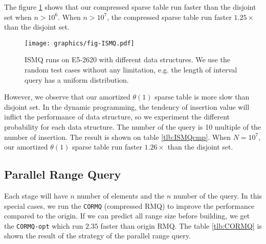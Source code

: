 The figure \ref{fig:fig-ISMQcmp} shows that our compressed sparse
table run faster than the disjoint set when $n > 10^6$.  When $n >
10^7$, the compressed sparse table run faster $1.25 \times$ than the
disjoint set.  



\begin{figure}[!thb]
  \centering
  \texttt{[image: graphics/fig-ISMQ.pdf]}
  \caption{ISMQ runs on E5-2620 with different data structures. We use the random test cases without any limitation, e.g. the length of interval query has a uniform distribution.}
  \label{fig:fig-ISMQcmp}
\end{figure}

However, we observe that our amortized $\theta(1)$ sparse table is
more slow than disjoint set.  In the dynamic programming, the tendency
of insertion value will inflict the performance of data structure, so
we experiment the different probability for each data structure.  The
number of the query is 10 multiple of the number of insertion.  The
result is shown on table \ref{tlb:ISMQcmp}.  When $N=10^7$, our
amortized $\theta(1)$ sparse table run faster $1.26 \times$ than the
disjoint set.

\iffalse
當運行 $n > 10^6$ 時，我們提出的壓縮稀疏表的效能已經勝過并查集的版本，
其運行結果如圖表 ~\ref{fig:fig-ISMQcmp}。在 $n = 10^7$ 時，加速 $1.25 \times$。
然而，我們提供的 amortized $\theta(1)$ 的稀疏表慢於并查集，
我們做了深入的機率探討 (參照表 ~\ref{tlb:ISMQcmp})，由於大部分的操作都被區塊後綴和前綴解決，
沒有實際運用到內部詢問，約束區間詢問的大小為 $L$，在 $N = 10^7$ 時，最多能加速 $1.26 \times$，
其中插入和詢問比例為 1:10，當詢問比重更大時，將有更明顯的加速。
\fi



\subsection{Parallel Range Query}

Each stage will have $n$ number of elements and the $n$ number of the
query.  In this special cases, we run the \texttt{CORMQ} (compressed
RMQ) to improve the performance compared to the origin.  If we can
predict all range size before building, we get the \texttt{CORMQ-opt}
which run $2.35$ faster than origin RMQ.  The table \ref{tlb:CORMQ} is
shown the result of the strategy of the parallel range query.

\iffalse
每一次有 $n$ 個元素和 $n$ 組詢問，針對這種特殊性質的問題，
我們運行樸素的 \texttt{CORMQ} (cache-oblivious RMQ) 得到效能改善，
搭配可預測的分析降低運算量 (參照 \texttt{CORMQ-opt})，得到更好的改善。
在 \texttt{CORMQ-opt} 策略中，得到 $2.35 \times$ 倍的加速，結果如表 ~\ref{tlb:CORMQ}。
\fi

